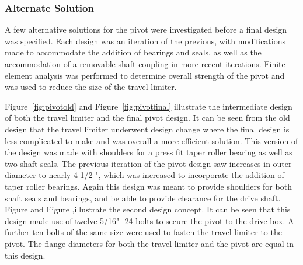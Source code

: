 \subsubsection{Alternate Solution}
A few alternative solutions for the pivot were investigated before a final design was specified. Each design was an iteration of the previous, with modifications made to accommodate the addition of bearings and seals, as well as the accommodation of a removable shaft coupling in more recent iterations. Finite element analysis was performed to determine overall strength of the pivot and was used to reduce the size of the travel limiter.

Figure~\ref{fig:pivotold} and Figure~\ref{fig:pivotfinal} illustrate the intermediate design of both the travel limiter and the final pivot design. It can be seen from the old design that the travel limiter underwent design change where the final design is less complicated to make and was overall a more efficient solution. This version of the design was made with shoulders for a press fit taper roller bearing as well as two shaft seals. The previous iteration of the pivot design saw increases in outer diameter to nearly 4 1/2 ", which was increased to incorporate the addition of taper roller bearings. Again this design was meant to provide shoulders for both shaft seals and bearings, and be able to provide clearance for the drive shaft. Figure and Figure ,illustrate the second design concept. It can be seen that this design made use of twelve 5/16"- 24 bolts to secure the pivot to the drive box. A further ten bolts of the same size were used to fasten the travel limiter to the pivot. The flange diameters for both the travel limiter and the pivot are equal in this design.

